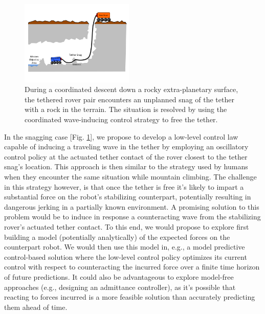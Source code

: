 \documentclass[12pt]{article}
\begin{document}
\begin{figure}
  \begin{center}
    \vspace{-0.4in}
    \includegraphics[width=0.48\textwidth, right]{cave_exploration}
  \end{center}
  \vspace{-0.4in}
  \caption{During a coordinated descent down a rocky extra-planetary surface, the tethered rover pair encounters an unplanned 
  snag of the tether with a rock in the terrain. The situation is resolved by using the coordinated wave-inducing control strategy to free 
  the tether.}
  \label{fig:tethersnag}
\end{figure}
In the snagging case [Fig. \ref{fig:tethersnag}], we propose to develop a low-level control law capable of inducing a 
traveling wave in the tether by employing 
an oscillatory control policy at the actuated tether contact of the rover closest to the tether snag's location. This approach is then 
similar to the strategy used by humans when they encounter the same situation while mountain climbing. 
The challenge in this strategy however, is that once the tether is free it's likely to impart a substantial 
force on the robot's stabilizing counterpart, potentially resulting in dangerous jerking in a partially known environment. 
A promising solution to this problem would be to induce in response a counteracting wave from the stabilizing rover's actuated tether 
contact. To this end, we would propose to explore first building a model (potentially analytically)
of the expected forces on the counterpart robot. We would then use this model in, e.g., a model predictive control-based solution where 
the low-level control policy optimizes its current control with respect to counteracting the incurred force over 
a finite time horizon of future predictions. It could also be advantageous to explore model-free approaches 
(e.g., designing an admittance controller), as it's possible that reacting to forces incurred is a more feasible 
solution than accurately predicting them ahead of time. 
\end{document}

